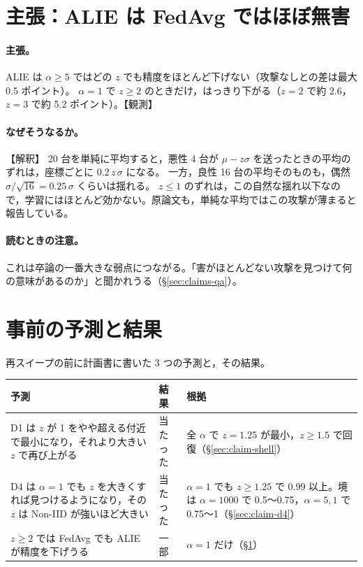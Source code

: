 \documentclass[a4j, dvipdfmx]{jsarticle}  %
\begin{document}
\section{主張：ALIE は FedAvg ではほぼ無害}
\label{sec:claim-harm}

\paragraph{主張。}
ALIE は $\alpha \ge 5$ ではどの $z$ でも精度をほとんど下げない（攻撃なしとの差は最大 0.5 ポイント）。
$\alpha = 1$ で $z \ge 2$ のときだけ，はっきり下がる（$z = 2$ で約 2.6，$z = 3$ で約 5.2 ポイント）。【観測】

\paragraph{なぜそうなるか。}【解釈】
20 台を単純に平均すると，悪性 4 台が $\mu - z\sigma$ を送ったときの平均のずれは，座標ごとに $0.2\,z\,\sigma$ になる。
一方，良性 16 台の平均そのものも，偶然 $\sigma / \sqrt{16} = 0.25\,\sigma$ くらいは揺れる。
$z \le 1$ のずれは，この自然な揺れ以下なので，学習にはほとんど効かない。原論文も，単純な平均ではこの攻撃が薄まると報告している。

\paragraph{読むときの注意。}
これは卒論の一番大きな弱点につながる。「害がほとんどない攻撃を見つけて何の意味があるのか」と聞かれうる（\S\ref{sec:claims-qa}）。

\section{事前の予測と結果}
\label{sec:claims-predictions}

再スイープの前に計画書に書いた 3 つの予測と，その結果。

\begin{table}[H]
\centering
\begin{tabular}{@{}P{6.4cm} P{1.8cm} P{7.1cm}@{}}
\toprule
予測 & 結果 & 根拠 \\
\midrule
D1 は $z$ が 1 をやや超える付近で最小になり，それより大きい $z$ で再び上がる & 当たった & 全 $\alpha$ で $z = 1.25$ が最小，$z \ge 1.5$ で回復（\S\ref{sec:claim-shell}） \\
D4 は $\alpha = 1$ でも $z$ を大きくすれば見つけるようになり，その $z$ は Non-IID が強いほど大きい & 当たった & $\alpha = 1$ でも $z \ge 1.25$ で 0.99 以上。境は $\alpha = 1000$ で 0.5〜0.75，$\alpha = 5, 1$ で 0.75〜1（\S\ref{sec:claim-d4}） \\
$z \ge 2$ では FedAvg でも ALIE が精度を下げうる & 一部 & $\alpha = 1$ だけ（\S\ref{sec:claim-harm}） \\
\bottomrule
\end{tabular}
\end{table}
\end{document}
